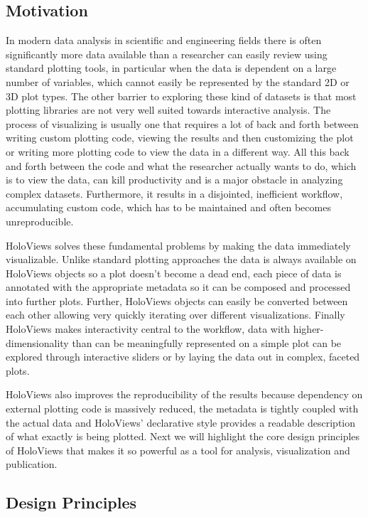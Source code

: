 \subsection{Motivation}

In modern data analysis in scientific and engineering fields there is
often significantly more data available than a researcher can easily
review using standard plotting tools, in particular when the data is
dependent on a large number of variables, which cannot easily be
represented by the standard 2D or 3D plot types. The other barrier to
exploring these kind of datasets is that most plotting libraries are
not very well suited towards interactive analysis. The process of
visualizing is usually one that requires a lot of back and forth
between writing custom plotting code, viewing the results and then
customizing the plot or writing more plotting code to view the data in
a different way. All this back and forth between the code and what the
researcher actually wants to do, which is to view the data, can kill
productivity and is a major obstacle in analyzing complex
datasets. Furthermore, it results in a disjointed, inefficient
workflow, accumulating custom code, which has to be maintained and
often becomes unreproducible.

HoloViews solves these fundamental problems by making the data
immediately visualizable. Unlike standard plotting approaches the data
is always available on HoloViews objects so a plot doesn't become a
dead end, each piece of data is annotated with the appropriate
metadata so it can be composed and processed into further
plots. Further, HoloViews objects can easily be converted between each
other allowing very quickly iterating over different
visualizations. Finally HoloViews makes interactivity central to the
workflow, data with higher-dimensionality than can be meaningfully
represented on a simple plot can be explored through interactive
sliders or by laying the data out in complex, faceted plots.

HoloViews also improves the reproducibility of the results because
dependency on external plotting code is massively reduced, the
metadata is tightly coupled with the actual data and HoloViews'
declarative style provides a readable description of what exactly is
being plotted. Next we will highlight the core design principles of
HoloViews that makes it so powerful as a tool for analysis,
visualization and publication.

\subsection{Design Principles}

